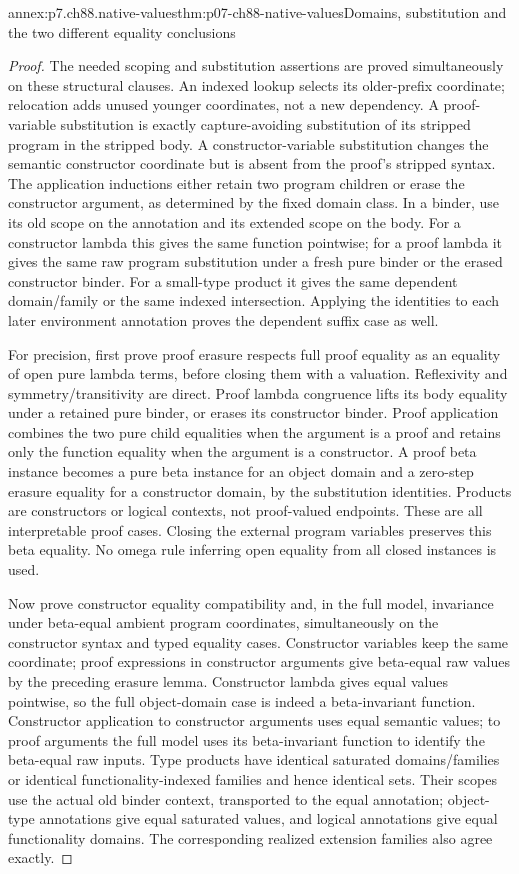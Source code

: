 \begin{annexitem}{annex:p7.ch88.native-values}{thm:p07-ch88-native-values}{Domains, substitution and the two different equality conclusions}
\begin{proof}
The needed scoping and substitution assertions are proved simultaneously
on these structural clauses. An indexed lookup selects its older-prefix
coordinate; relocation adds unused younger coordinates, not a new dependency.
A proof-variable substitution is exactly capture-avoiding substitution
of its stripped program in the stripped body. A constructor-variable
substitution changes the semantic constructor coordinate but is absent
from the proof's stripped syntax. The application inductions either
retain two program children or erase the constructor argument, as determined
by the fixed domain class. In a binder, use its old scope on the annotation
and its extended scope on the body. For a constructor lambda this gives
the same function pointwise; for a proof lambda it gives the same raw
program substitution under a fresh pure binder or the erased constructor
binder. For a small-type product it gives the same dependent domain/family
or the same indexed intersection. Applying the identities to each later
environment annotation proves the dependent suffix case as well.

For precision, first prove proof erasure respects full proof equality
as an equality of open pure lambda terms, before closing them with a
valuation. Reflexivity and symmetry/transitivity are direct. Proof lambda
congruence lifts its body equality under a retained pure binder, or
erases its constructor binder. Proof application combines the two pure
child equalities when the argument is a proof and retains only the
function equality when the argument is a constructor. A proof beta
instance becomes a pure beta instance for an object domain and a zero-step
erasure equality for a constructor domain, by the substitution identities.
Products are constructors or logical contexts, not proof-valued endpoints.
These are all interpretable proof cases. Closing the external program
variables preserves this beta equality. No omega rule inferring open
equality from all closed instances is used.

Now prove constructor equality compatibility and, in the full model,
invariance under beta-equal ambient program coordinates, simultaneously
on the constructor syntax and typed equality cases. Constructor variables
keep the same coordinate; proof expressions in constructor arguments
give beta-equal raw values by the preceding erasure lemma. Constructor
lambda gives equal values pointwise, so the full object-domain case is
indeed a beta-invariant function. Constructor application to constructor
arguments uses equal semantic values; to proof arguments the full model
uses its beta-invariant function to identify the beta-equal raw inputs.
Type products have identical saturated domains/families or identical
functionality-indexed families and hence identical sets. Their scopes
use the actual old binder context, transported to the equal annotation;
object-type annotations give equal saturated values, and logical annotations
give equal functionality domains. The corresponding realized extension
families also agree exactly.


\end{proof}
\end{annexitem}
